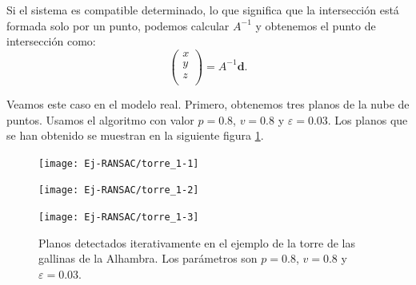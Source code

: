 Si el sistema es compatible determinado, lo que significa que la intersección está formada solo por un punto, podemos calcular $ A^{-1} $ y obtenemos el punto de intersección como:
\[
\begin{pmatrix}
x\\
y\\
z\\
\end{pmatrix} = A^{-1}\mathbf{d}.
\]

Veamos este caso en el modelo real. Primero, obtenemos tres planos de la nube de puntos. Usamos el algoritmo con valor $ p = 0.8 $, $ v = 0.8 $ y $ \varepsilon = 0.03 $. Los planos que se han obtenido se muestran en la siguiente figura \ref{fig:RNASACptoInter}. \\
\begin{figure}[h!]
	\begin{minipage}{0.5\textwidth}
		\centering
		\texttt{[image: Ej-RANSAC/torre\_1-1]} 
	\end{minipage}
	\begin{minipage}{0.5\textwidth}
		\centering
		\texttt{[image: Ej-RANSAC/torre\_1-2]} 
	\end{minipage}
	\begin{center}
		\begin{minipage}{0.5\textwidth}
		\centering
		\texttt{[image: Ej-RANSAC/torre\_1-3]} 
	\end{minipage}
	\end{center}
	\caption{Planos detectados iterativamente en el ejemplo de la torre de las gallinas de la Alhambra. Los parámetros son $ p = 0.8 $, $ v = 0.8 $ y $ \varepsilon = 0.03 $.}
	\label{fig:RNASACptoInter}
\end{figure}

